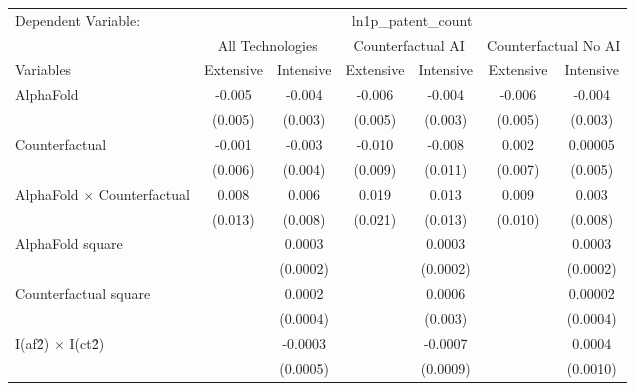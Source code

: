 \begingroup
\centering
\begin{tabular}{lcccccc}
   \tabularnewline \midrule \midrule
   Dependent Variable: & \multicolumn{6}{c}{ln1p\_patent\_count}\\
 & \multicolumn{2}{c}{All Technologies} & \multicolumn{2}{c}{Counterfactual AI} & \multicolumn{2}{c}{Counterfactual No AI} \\
\cmidrule(lr){1-1}\cmidrule(lr){2-3} \cmidrule(lr){4-5} \cmidrule(lr){6-7}
Variables & \multicolumn{1}{c}{Extensive} & \multicolumn{1}{c}{Intensive} & \multicolumn{1}{c}{Extensive} & \multicolumn{1}{c}{Intensive} & \multicolumn{1}{c}{Extensive} & \multicolumn{1}{c}{Intensive} \\
\cmidrule(lr){1-1}\cmidrule(lr){2-2} \cmidrule(lr){3-3} \cmidrule(lr){4-4} \cmidrule(lr){5-5} \cmidrule(lr){6-6} \cmidrule(lr){7-7}
   AlphaFold                          & -0.005  & -0.004   & -0.006  & -0.004   & -0.006  & -0.004\\   
                                      & (0.005) & (0.003)  & (0.005) & (0.003)  & (0.005) & (0.003)\\   
   Counterfactual                     & -0.001  & -0.003   & -0.010  & -0.008   & 0.002   & 0.00005\\   
                                      & (0.006) & (0.004)  & (0.009) & (0.011)  & (0.007) & (0.005)\\   
   AlphaFold $\times$ Counterfactual  & 0.008   & 0.006    & 0.019   & 0.013    & 0.009   & 0.003\\   
                                      & (0.013) & (0.008)  & (0.021) & (0.013)  & (0.010) & (0.008)\\   
   AlphaFold square                   &         & 0.0003   &         & 0.0003   &         & 0.0003\\   
                                      &         & (0.0002) &         & (0.0002) &         & (0.0002)\\   
   Counterfactual square              &         & 0.0002   &         & 0.0006   &         & 0.00002\\   
                                      &         & (0.0004) &         & (0.003)  &         & (0.0004)\\   
   I(af\^2) $\times$ I(ct\^2)         &         & -0.0003  &         & -0.0007  &         & 0.0004\\   
                                      &         & (0.0005) &         & (0.0009) &         & (0.0010)\\   
   \midrule

\end{tabular}
